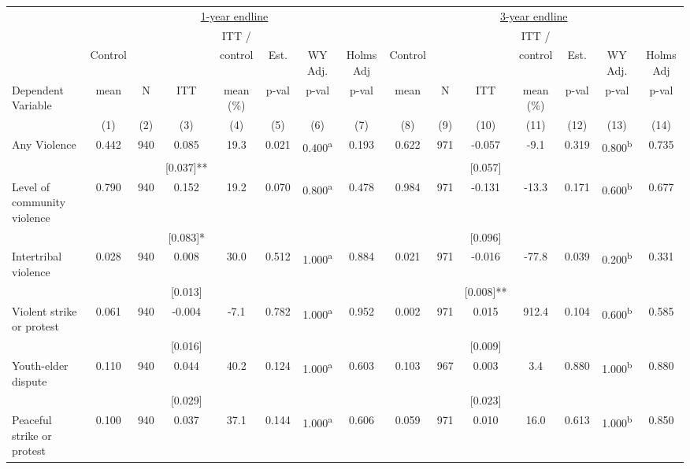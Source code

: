 \begin{tabular}{lcccccccccccccc}
\hline \noalign{\smallskip} & \multicolumn{7}{c}{\uline{\hfill 1-year endline \hfill}} & \multicolumn{7}{c}{\uline{\hfill 3-year endline \hfill}}\\
 &  &  &  & ITT / &  &  &  &  &  &  & ITT / &  &  & \\
 & Control &  &  & control & Est. & WY Adj. & Holms Adj & Control &  &  & control & Est. & WY Adj. & Holms Adj\\
Dependent Variable & mean & N & ITT & mean (\%) & p-val & p-val & p-val & mean & N & ITT & mean (\%) & p-val & p-val & p-val\\
 & (1) & (2) & (3) & (4) & (5) & (6) & (7) & (8) & (9) & (10) & (11) & (12) & (13) & (14)\\
\noalign{\smallskip}\hline \noalign{\smallskip}Any Violence & 0.442 & 940 & 0.085 & 19.3 & 0.021 & 0.400\textsuperscript{a} & 0.193 & 0.622 & 971 & -0.057 & -9.1 & 0.319 & 0.800\textsuperscript{b} & 0.735\\
 &  &  & [0.037]** &  &  &  &  &  &  & [0.057] &  &  &  & \\
Level of community violence & 0.790 & 940 & 0.152 & 19.2 & 0.070 & 0.800\textsuperscript{a} & 0.478 & 0.984 & 971 & -0.131 & -13.3 & 0.171 & 0.600\textsuperscript{b} & 0.677\\
 &  &  & [0.083]* &  &  &  &  &  &  & [0.096] &  &  &  & \\
\quad Intertribal violence & 0.028 & 940 & 0.008 & 30.0 & 0.512 & 1.000\textsuperscript{a} & 0.884 & 0.021 & 971 & -0.016 & -77.8 & 0.039 & 0.200\textsuperscript{b} & 0.331\\
 &  &  & [0.013] &  &  &  &  &  &  & [0.008]** &  &  &  & \\
\quad Violent strike or protest & 0.061 & 940 & -0.004 & -7.1 & 0.782 & 1.000\textsuperscript{a} & 0.952 & 0.002 & 971 & 0.015 & 912.4 & 0.104 & 0.600\textsuperscript{b} & 0.585\\
 &  &  & [0.016] &  &  &  &  &  &  & [0.009] &  &  &  & \\
\quad Youth-elder dispute & 0.110 & 940 & 0.044 & 40.2 & 0.124 & 1.000\textsuperscript{a} & 0.603 & 0.103 & 967 & 0.003 & 3.4 & 0.880 & 1.000\textsuperscript{b} & 0.880\\
 &  &  & [0.029] &  &  &  &  &  &  & [0.023] &  &  &  & \\
\quad Peaceful strike or protest & 0.100 & 940 & 0.037 & 37.1 & 0.144 & 1.000\textsuperscript{a} & 0.606 & 0.059 & 971 & 0.010 & 16.0 & 0.613 & 1.000\textsuperscript{b} & 0.850\\

\end{tabular}
